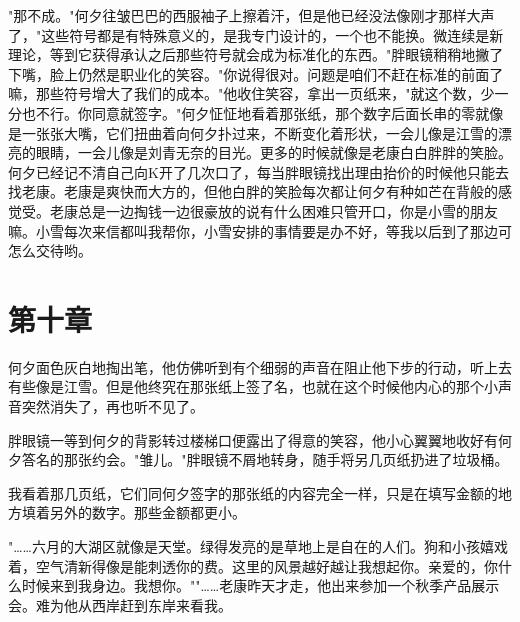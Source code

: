\documentclass[UTF8]{ctexart}
\begin{document}
"那不成。"何夕往皱巴巴的西服袖子上擦着汗，但是他已经没法像刚才那样大声了，"这些符号都是有特殊意义的，是我专门设计的，一个也不能换。微连续是新理论，等到它获得承认之后那些符号就会成为标准化的东西。"胖眼镜稍稍地撇了下嘴，脸上仍然是职业化的笑容。"你说得很对。问题是咱们不赶在标准的前面了嘛，那些符号增大了我们的成本。"他收住笑容，拿出一页纸来，"就这个数，少一分也不行。你同意就签字。"何夕怔怔地看着那张纸，那个数字后面长串的零就像是一张张大嘴，它们扭曲着向何夕扑过来，不断变化着形状，一会儿像是江雪的漂亮的眼睛，一会儿像是刘青无奈的目光。更多的时候就像是老康白白胖胖的笑脸。何夕已经记不清自己向K开了几次口了，每当胖眼镜找出理由抬价的时候他只能去找老康。老康是爽快而大方的，但他白胖的笑脸每次都让何夕有种如芒在背般的感觉受。老康总是一边掏钱一边很豪放的说有什么困难只管开口，你是小雪的朋友嘛。小雪每次来信都叫我帮你，小雪安排的事情要是办不好，等我以后到了那边可怎么交待哟。

\clearpage

\section*{第十章}
何夕面色灰白地掏出笔，他仿佛听到有个细弱的声音在阻止他下步的行动，听上去有些像是江雪。但是他终究在那张纸上签了名，也就在这个时候他内心的那个小声音突然消失了，再也听不见了。

胖眼镜一等到何夕的背影转过楼梯口便露出了得意的笑容，他小心翼翼地收好有何夕答名的那张约会。"雏儿。"胖眼镜不屑地转身，随手将另几页纸扔进了垃圾桶。

我看着那几页纸，它们同何夕签字的那张纸的内容完全一样，只是在填写金额的地方填着另外的数字。那些金额都更小。

"……六月的大湖区就像是天堂。绿得发亮的是草地上是自在的人们。狗和小孩嬉戏着，空气清新得像是能刺透你的费。这里的风景越好越让我想起你。亲爱的，你什么时候来到我身边。我想你。""……老康昨天才走，他出来参加一个秋季产品展示会。难为他从西岸赶到东岸来看我。
\end{document}

